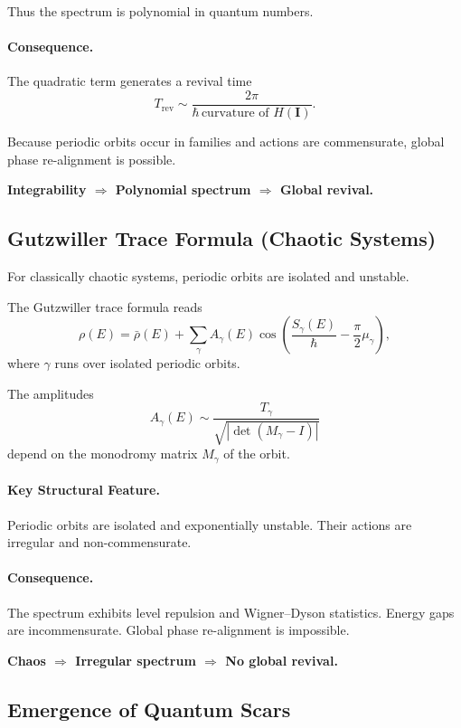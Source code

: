\documentclass[11pt]{article}
\begin{document}
Thus the spectrum is polynomial in quantum numbers.

\paragraph{Consequence.}
The quadratic term generates a revival time
\[
T_{\mathrm{rev}} \sim \frac{2\pi}{\hbar\, \text{curvature of } H(\mathbf{I})}.
\]

Because periodic orbits occur in families and actions are commensurate,
global phase re-alignment is possible.

\begin{center}
\textbf{Integrability $\Rightarrow$ Polynomial spectrum $\Rightarrow$ Global revival.}
\end{center}

\subsection{Gutzwiller Trace Formula (Chaotic Systems)}

For classically chaotic systems, periodic orbits are isolated and unstable.

The Gutzwiller trace formula reads
\[
\rho(E)
=
\bar{\rho}(E)
+
\sum_{\gamma}
A_\gamma(E)
\cos\!\left(
\frac{S_\gamma(E)}{\hbar}
-
\frac{\pi}{2}\mu_\gamma
\right),
\]
where $\gamma$ runs over isolated periodic orbits.

The amplitudes
\[
A_\gamma(E)
\sim
\frac{T_\gamma}{\sqrt{|\det(M_\gamma - I)|}}
\]
depend on the monodromy matrix $M_\gamma$ of the orbit.

\paragraph{Key Structural Feature.}
Periodic orbits are isolated and exponentially unstable.
Their actions are irregular and non-commensurate.

\paragraph{Consequence.}
The spectrum exhibits level repulsion and Wigner--Dyson statistics.
Energy gaps are incommensurate.
Global phase re-alignment is impossible.

\begin{center}
\textbf{Chaos $\Rightarrow$ Irregular spectrum $\Rightarrow$ No global revival.}
\end{center}

\subsection{Emergence of Quantum Scars}
\end{document}
